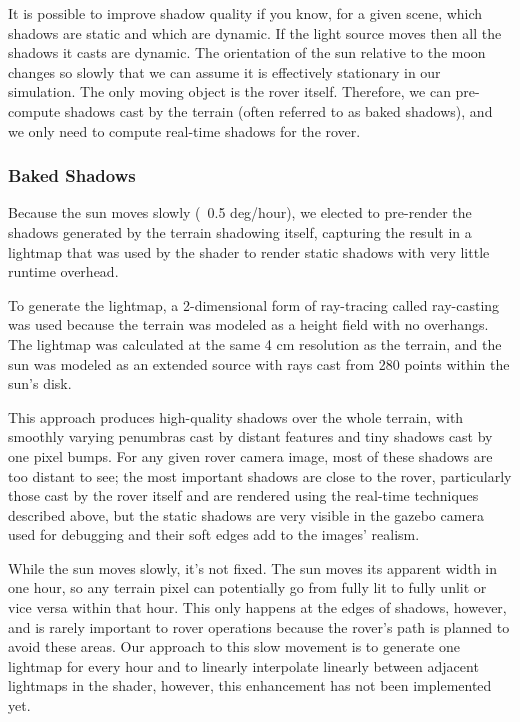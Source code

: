 \documentclass[twocolumn,letterpaper]{IEEEAerospaceCLS}  %
\begin{document}
It is possible to improve shadow quality if you know, for a given scene, which shadows are static and which are dynamic. 
If the light source moves then all the shadows it casts are dynamic. 
The orientation of the sun relative to the moon changes so slowly that we can assume it is effectively stationary in our simulation. 
The only moving object is the rover itself. 
Therefore, we can pre-compute shadows cast by the terrain (often referred to as baked shadows), and we only need to compute real-time shadows for the rover.

\subsubsection{Baked Shadows}

Because the sun moves slowly (~0.5 deg/hour), we elected to pre-render the shadows generated by the terrain shadowing itself, capturing the result in a lightmap that was used by the shader to render static shadows with very little runtime overhead.

To generate the lightmap, a 2-dimensional form of ray-tracing called ray-casting was used because the terrain was modeled as a height field with no overhangs.  
The lightmap was calculated at the same 4 cm resolution as the terrain, and the sun was modeled as an extended source with rays cast from 280 points within the sun's disk.

This approach produces high-quality shadows over the whole terrain, with smoothly varying penumbras cast by distant features and tiny shadows cast by one pixel bumps.  
For any given rover camera image, most of these shadows are too distant to see; the most important shadows are close to the rover, particularly those cast by the rover itself and are rendered using the real-time techniques described above, but the static shadows are very visible in the gazebo camera used for debugging and their soft edges add to the images' realism.

While the sun moves slowly, it's not fixed.  
The sun moves its apparent width in one hour, so any terrain pixel can potentially go from fully lit to fully unlit or vice versa within that hour.  
This only happens at the edges of shadows, however, and is rarely important to rover operations because the rover's path is planned to avoid these areas.  
Our approach to this slow movement is to generate one lightmap for every hour and to linearly interpolate linearly between adjacent lightmaps in the shader, however, this enhancement has not been implemented yet.
\end{document}
